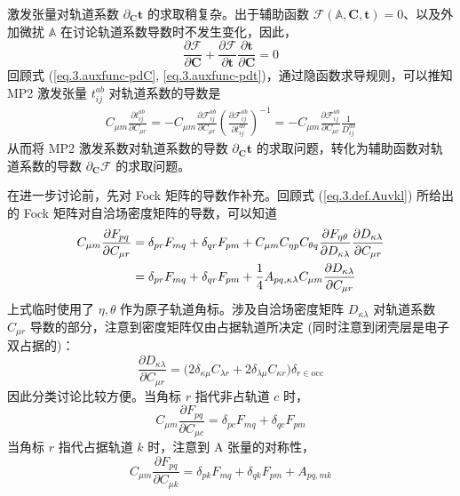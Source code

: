 激发张量对轨道系数 $\partial_\mathbf{C} \mathbf{t}$ 的求取稍复杂。出于辅助函数 $\pmb{\mathscr{F}} (\mathbb{A}, \mathbf{C}, \mathbf{t}) = 0$、以及外加微扰 $\mathbb{A}$ 在讨论轨道系数导数时不发生变化，因此，
\begin{equation}
  \label{eq.3.auxfunc-pdC}
  \frac{\partial \pmb{\mathscr{F}}}{\partial \mathbf{C}} + \frac{\partial \pmb{\mathscr{F}}}{\partial \mathbf{t}} \frac{\partial \mathbf{t}}{\partial \mathbf{C}} = 0
\end{equation}
回顾式 (\ref{eq.3.auxfunc-pdC}, \ref{eq.3.auxfunc-pdt})，通过隐函数求导规则，可以推知 MP2 激发张量 $t_{ij}^{ab}$ 对轨道系数的导数是
\begin{align}
  \label{eq.3.relation-tpdc-fpdc}
  C_{\mu m} \frac{\partial t_{ij}^{ab}}{\partial C_{\mu r}}
  = - C_{\mu m} \frac{\partial \mathscr{F}_{ij}^{ab}}{\partial C_{\mu r}} \left( \frac{\partial \mathscr{F}_{ij}^{ab}}{\partial t_{ij}^{ab}} \right)^{-1}
  = - C_{\mu m} \frac{\partial \mathscr{F}_{ij}^{ab}}{\partial C_{\mu r}} \frac{1}{D_{ij}^{ab}}
\end{align}
从而将 MP2 激发系数对轨道系数的导数 $\partial_\mathbf{C} \mathbf{t}$ 的求取问题，转化为辅助函数对轨道系数的导数 $\partial_\mathbf{C} \pmb{\mathscr{F}}$ 的求取问题。

在进一步讨论前，先对 Fock 矩阵的导数作补充。回顾式 (\ref{eq.3.def.Auvkl}) 所给出的 Fock 矩阵对自洽场密度矩阵的导数，可以知道
\begin{align}
  C_{\mu m} \frac{\partial F_{pq}}{\partial C_{\mu r}} &= \delta_{pr} F_{mq} + \delta_{qr} F_{pm} + C_{\mu m} C_{\eta p} C_{\theta q} \frac{\partial F_{\eta \theta}}{\partial D_{\kappa \lambda}} \frac{\partial D_{\kappa \lambda}}{\partial C_{\mu r}} \notag\\
  &= \delta_{pr} F_{mq} + \delta_{qr} F_{pm} + \frac{1}{4} A_{pq, \kappa \lambda} C_{\mu m} \frac{\partial D_{\kappa \lambda}}{\partial C_{\mu r}}
\end{align}
上式临时使用了 $\eta, \theta$ 作为原子轨道角标。涉及自洽场密度矩阵 $D_{\kappa \lambda}$ 对轨道系数 $C_{\mu r}$ 导数的部分，注意到密度矩阵仅由占据轨道所决定 (同时注意到闭壳层是电子双占据的)：
\begin{equation}
  \frac{\partial D_{\kappa \lambda}}{\partial C_{\mu r}} = \big( 2 \delta_{\kappa \mu} C_{\lambda r} + 2 \delta_{\lambda \mu} C_{\kappa r} \big) \delta_{r \in \mathrm{occ}}
\end{equation}
因此分类讨论比较方便。当角标 $r$ 指代非占轨道 $c$ 时，
\begin{equation}
  C_{\mu m} \frac{\partial F_{pq}}{\partial C_{\mu c}} = \delta_{pc} F_{mq} + \delta_{qc} F_{pm}
\end{equation}
当角标 $r$ 指代占据轨道 $k$ 时，注意到 A 张量的对称性，
\begin{equation}
  C_{\mu m} \frac{\partial F_{pq}}{\partial C_{\mu k}} = \delta_{pk} F_{mq} + \delta_{qk} F_{pm} + A_{pq, mk}
\end{equation}

